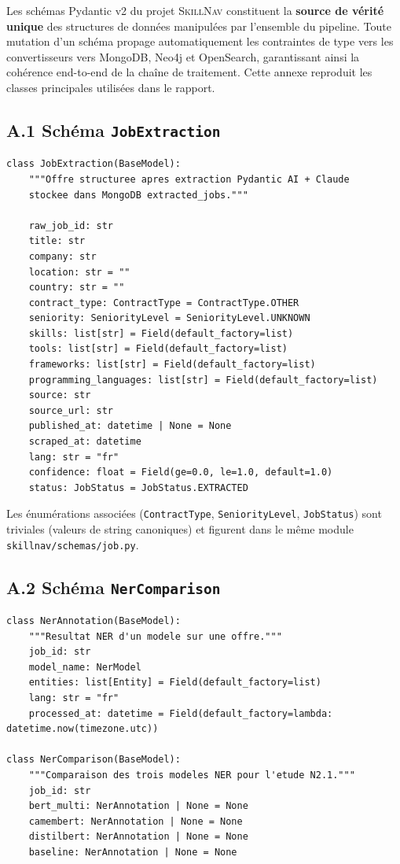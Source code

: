 \documentclass[11pt,a4paper,openany]{report}
\newcommand{\skillnav}{\textsc{SkillNav}\xspace}
\begin{document}
Les sch\'emas Pydantic v2 du projet \skillnav constituent la \textbf{source de v\'erit\'e unique} des structures de donn\'ees manipul\'ees par l'ensemble du pipeline. Toute mutation d'un sch\'ema propage automatiquement les contraintes de type vers les convertisseurs vers MongoDB, Neo4j et OpenSearch, garantissant ainsi la coh\'erence end-to-end de la cha\^ine de traitement. Cette annexe reproduit les classes principales utilis\'ees dans le rapport.

\subsection*{A.1 Sch\'ema \texttt{JobExtraction}}

\begin{lstlisting}[caption={Extrait de \texttt{skillnav/schemas/job.py}}]
class JobExtraction(BaseModel):
    """Offre structuree apres extraction Pydantic AI + Claude
    stockee dans MongoDB extracted_jobs."""

    raw_job_id: str
    title: str
    company: str
    location: str = ""
    country: str = ""
    contract_type: ContractType = ContractType.OTHER
    seniority: SeniorityLevel = SeniorityLevel.UNKNOWN
    skills: list[str] = Field(default_factory=list)
    tools: list[str] = Field(default_factory=list)
    frameworks: list[str] = Field(default_factory=list)
    programming_languages: list[str] = Field(default_factory=list)
    source: str
    source_url: str
    published_at: datetime | None = None
    scraped_at: datetime
    lang: str = "fr"
    confidence: float = Field(ge=0.0, le=1.0, default=1.0)
    status: JobStatus = JobStatus.EXTRACTED
\end{lstlisting}

Les \'enum\'erations associ\'ees (\texttt{ContractType}, \texttt{SeniorityLevel}, \texttt{JobStatus}) sont triviales (valeurs de string canoniques) et figurent dans le m\^eme module \texttt{skillnav/schemas/job.py}.

\subsection*{A.2 Sch\'ema \texttt{NerComparison}}

\begin{lstlisting}[caption={Extrait de \texttt{skillnav/schemas/ner.py}}]
class NerAnnotation(BaseModel):
    """Resultat NER d'un modele sur une offre."""
    job_id: str
    model_name: NerModel
    entities: list[Entity] = Field(default_factory=list)
    lang: str = "fr"
    processed_at: datetime = Field(default_factory=lambda: datetime.now(timezone.utc))

class NerComparison(BaseModel):
    """Comparaison des trois modeles NER pour l'etude N2.1."""
    job_id: str
    bert_multi: NerAnnotation | None = None
    camembert: NerAnnotation | None = None
    distilbert: NerAnnotation | None = None
    baseline: NerAnnotation | None = None
\end{lstlisting}
\end{document}
